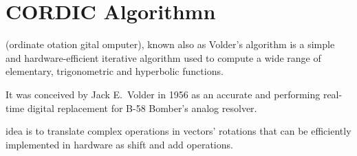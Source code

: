 \chapter{CORDIC Algorithmn}\label{ch:algorithm}

\cordic{} (ordinate otation gital
omputer), known also as Volder's algorithm is a simple and
hardware-efficient iterative algorithm used to compute a wide range of
elementary, trigonometric and hyperbolic functions.

It was conceived by Jack E.\ Volder in 1956 as an accurate and performing
real-time digital replacement for B-58 Bomber's analog resolver.

\cordic{} idea is to translate complex operations in vectors' rotations that can
be efficiently implemented in hardware as shift and add operations.



